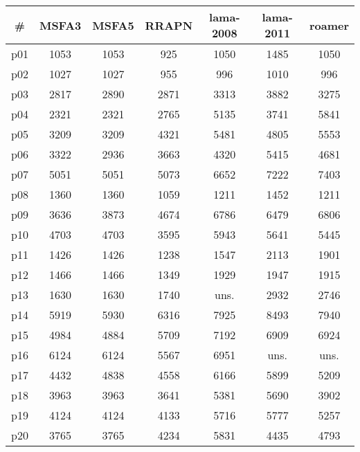 \begin{tabular}{c||c|c|c|c|c|c}
\textbf{\#} & \textbf{MSFA3} & \textbf{MSFA5} & \textbf{RRAPN} & \textbf{lama-2008} & \textbf{lama-2011} & \textbf{roamer}\\
\hline
\hline
p01 & 1053 & 1053 & 925 & 1050 & 1485 & 1050\\
p02 & 1027 & 1027 & 955 & 996 & 1010 & 996\\
p03 & 2817 & 2890 & 2871 & 3313 & 3882 & 3275\\
p04 & 2321 & 2321 & 2765 & 5135 & 3741 & 5841\\
p05 & 3209 & 3209 & 4321 & 5481 & 4805 & 5553\\
p06 & 3322 & 2936 & 3663 & 4320 & 5415 & 4681\\
p07 & 5051 & 5051 & 5073 & 6652 & 7222 & 7403\\
p08 & 1360 & 1360 & 1059 & 1211 & 1452 & 1211\\
p09 & 3636 & 3873 & 4674 & 6786 & 6479 & 6806\\
p10 & 4703 & 4703 & 3595 & 5943 & 5641 & 5445\\
p11 & 1426 & 1426 & 1238 & 1547 & 2113 & 1901\\
p12 & 1466 & 1466 & 1349 & 1929 & 1947 & 1915\\
p13 & 1630 & 1630 & 1740 & uns. & 2932 & 2746\\
p14 & 5919 & 5930 & 6316 & 7925 & 8493 & 7940\\
p15 & 4984 & 4884 & 5709 & 7192 & 6909 & 6924\\
p16 & 6124 & 6124 & 5567 & 6951 & uns. & uns.\\
p17 & 4432 & 4838 & 4558 & 6166 & 5899 & 5209\\
p18 & 3963 & 3963 & 3641 & 5381 & 5690 & 3902\\
p19 & 4124 & 4124 & 4133 & 5716 & 5777 & 5257\\
p20 & 3765 & 3765 & 4234 & 5831 & 4435 & 4793\\
\end{tabular}


